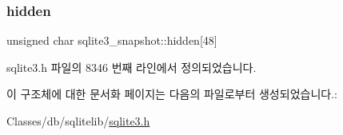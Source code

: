 \subsubsection{\texorpdfstring{hidden}{hidden}}
{\footnotesize\ttfamily unsigned char sqlite3\+\_\+snapshot\+::hidden\mbox{[}48\mbox{]}}



sqlite3.\+h 파일의 8346 번째 라인에서 정의되었습니다.



이 구조체에 대한 문서화 페이지는 다음의 파일로부터 생성되었습니다.\+:\begin{DoxyCompactItemize}
\item 
Classes/db/sqlitelib/\hyperlink{sqlite3_8h}{sqlite3.\+h}\end{DoxyCompactItemize}

